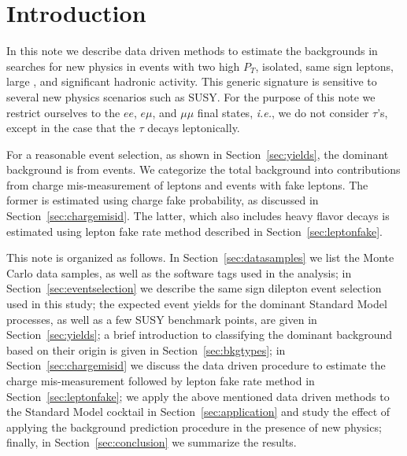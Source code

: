 \section{Introduction}
\label{sec:intro}
In this note we describe data driven methods to estimate the backgrounds in 
searches for new physics in events with two high $P_T$, isolated, same sign leptons,
large \met, and  significant hadronic activity.  This generic signature is sensitive to several
new physics scenarios such as SUSY.  For the purpose of this note we restrict
ourselves to the $ee$, $e\mu$, and $\mu\mu$ final states, {\em i.e.}, we 
do not consider $\tau$'s, except in the case that the $\tau$ decays leptonically.

For a reasonable event selection, as shown in Section~\ref{sec:yields}, the dominant
background is from \ttbar events. We categorize the total background into contributions
from charge mis-measurement of leptons and events with fake leptons. The former is estimated 
using charge fake probability, as discussed in Section~\ref{sec:chargemisid}. The latter, which
also includes  heavy flavor decays is estimated using lepton fake rate 
method described in Section~\ref{sec:leptonfake}.

This note is organized as follows. In Section~\ref{sec:datasamples} we list the 
Monte Carlo data samples, as well as the software tags used 
in the analysis; in Section~\ref{sec:eventselection} we describe the same sign dilepton event 
selection used in this study;  the expected event yields for the dominant 
Standard Model processes, as well as a few SUSY benchmark points, are given in Section~\ref{sec:yields}; 
a brief introduction to classifying the dominant background based on their origin
is given in Section~\ref{sec:bkgtypes}; in Section~\ref{sec:chargemisid} we discuss the data driven 
procedure to estimate the charge mis-measurement followed by lepton fake rate method in 
Section~\ref{sec:leptonfake}; we apply the above mentioned data driven methods to the Standard Model 
cocktail in Section~\ref{sec:application} and study the effect of applying the background
prediction procedure in the presence of new physics; finally, in Section~\ref{sec:conclusion}
we summarize the results.  

